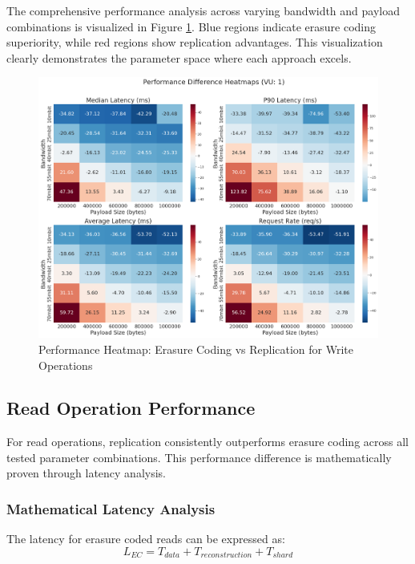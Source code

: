 The comprehensive performance analysis across varying bandwidth and payload combinations is visualized in Figure \ref{fig:write-heatmap}. Blue regions indicate erasure coding superiority, while red regions show replication advantages. This visualization clearly demonstrates the parameter space where each approach excels.

\begin{figure}[ht]
    \centering
    \includegraphics[width=\columnwidth]{resources/chapter-4/write_bigload_avgnet_heatmap.png}
    \caption{Performance Heatmap: Erasure Coding vs Replication for Write Operations}
    \label{fig:write-heatmap}
\end{figure}

\subsection{Read Operation Performance}

For read operations, replication consistently outperforms erasure coding across all tested parameter combinations. This performance difference is mathematically proven through latency analysis.

\subsubsection{Mathematical Latency Analysis}

The latency for erasure coded reads can be expressed as:
\begin{equation}
L_{EC} = T_{data} + T_{reconstruction} + T_{shard}
\label{eq:ec-read-latency}
\end{equation}

